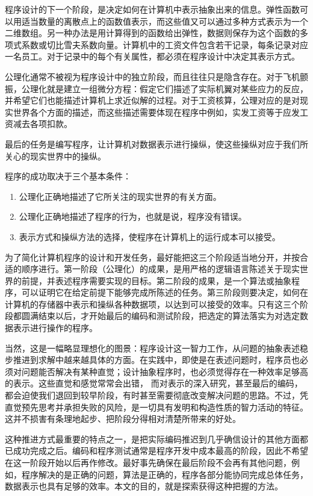 程序设计的下一个阶段，是决定如何在计算机中表示抽象出来的信息。弹性函数可以用适当数量的离散点上的函数值表示，而这些值又可以通过多种方式表示为一个二维数组。另一种办法是用计算得到的函数给出弹性，数据则保存为这个函数的多项式系数或切比雪夫系数向量。计算机中的工资文件包含若干记录，每条记录对应一名员工。对于记录中的每个有关属性，都必须在程序设计中决定其表示方式。

公理化通常不被视为程序设计中的独立阶段，而且往往只是隐含存在。对于飞机颤振，公理化就是建立一组微分方程：假定它们描述了实际机翼对某些应力的反应，并希望它们也能描述计算机上求近似解的过程。对于工资核算，公理对应的是对现实世界各个方面的描述，而这些描述需要体现在程序中\textemdash{}例如，实发工资等于应发工资减去各项扣款。

最后的任务是编写程序，让计算机对数据表示进行操纵，使这些操纵对应于我们所关心的现实世界中的操纵。

程序的成功取决于三个基本条件：

\begin{enumerate}[wide, nosep, label=(\arabic*)]
	\item 公理化正确地描述了它所关注的现实世界的有关方面。
	\item 公理化正确地描述了程序的行为，也就是说，程序没有错误。
	\item 表示方式和操纵方法的选择，使程序在计算机上的运行成本可以接受。
\end{enumerate}

为了简化计算机程序的设计和开发任务，最好能把这三个阶段适当地分开，并按合适的顺序进行。第一阶段（公理化）的成果，是用严格的逻辑语言陈述关于现实世界的前提，并表述程序需要实现的目标。第二阶段的成果，是一个算法或抽象程序，可以证明它在给定前提下能够完成所陈述的任务。第三阶段则要决定，如何在计算机的存储器中表示和操纵各种数据项，以达到可以接受的效率。只有这三个阶段都圆满结束以后，才开始最后的编码和测试阶段，把选定的算法落实为对选定数据表示进行操作的程序。

当然，这是一幅略显理想化的图景：程序设计这一智力工作，从问题的抽象表述稳步推进到求解中越来越具体的方面。在实践中，即使是在表述问题时，程序员也必须对问题能否解决有某种直觉；设计抽象程序时，也必须觉得存在一种效率足够高的表示。这些直觉和感觉常常会出错，
而对表示的深入研究，甚至最后的编码，都会迫使我们退回到较早阶段，有时甚至需要彻底改变解决问题的思路。不过，凭直觉预先思考并承担失败的风险，是一切具有发明和构造性质的智力活动的特征。这并不损害有条理地起步、把阶段分得相对清楚所带来的好处。

这种推进方式最重要的特点之一，是把实际编码推迟到几乎确信设计的其他方面都已成功完成之后。编码和程序测试通常是程序开发中成本最高的阶段，因此不希望在这一阶段开始以后再作修改。最好事先确保在最后阶段不会再有其他问题，例如，程序解决的是正确的问题，算法是正确的，程序各部分能协同完成总体任务，数据表示也具有足够的效率。本文的目的，就是探索获得这种把握的方法。

